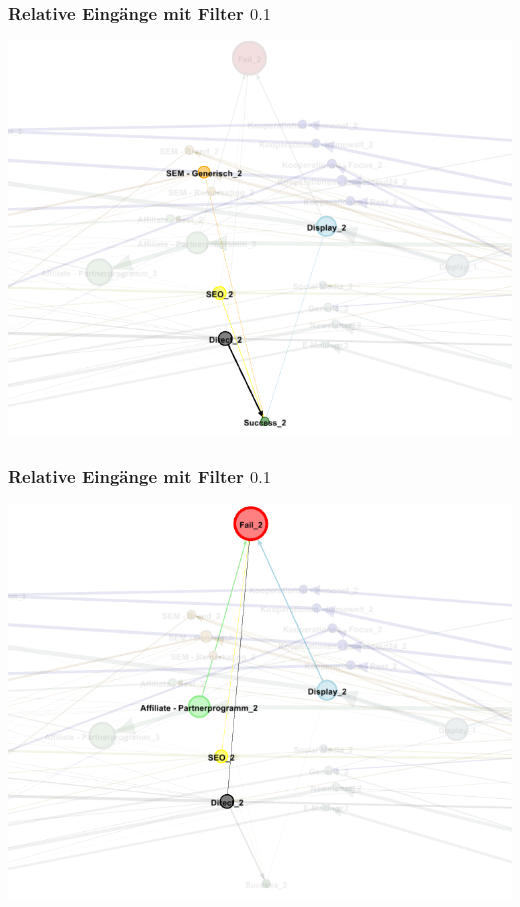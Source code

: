 \begin{frame}\frametitle{Relative Eingänge mit Filter $0.1$}
	\centering\includegraphics[scale=0.3]{in_filter_10_succ.png}
\end{frame}

\begin{frame}\frametitle{Relative Eingänge mit Filter $0.1$}
	\centering\includegraphics[scale=0.3]{in_filter_10_fail.png}
\end{frame}
